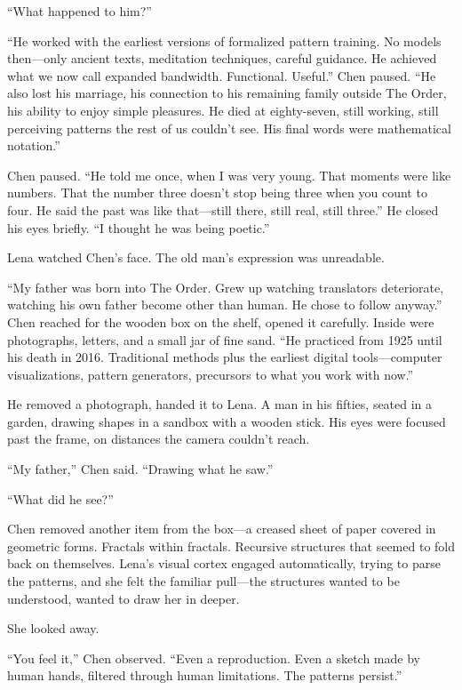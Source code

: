 ``What happened to him?''

``He worked with the earliest versions of formalized pattern training. No models then—only ancient texts, meditation techniques, careful guidance. He achieved what we now call expanded bandwidth. Functional. Useful.'' Chen paused. ``He also lost his marriage, his connection to his remaining family outside The Order, his ability to enjoy simple pleasures. He died at eighty-seven, still working, still perceiving patterns the rest of us couldn't see. His final words were mathematical notation.''

Chen paused. ``He told me once, when I was very young. That moments were like numbers. That the number three doesn't stop being three when you count to four. He said the past was like that---still there, still real, still three.'' He closed his eyes briefly. ``I thought he was being poetic.''

Lena watched Chen's face. The old man's expression was unreadable.

``My father was born into The Order. Grew up watching translators deteriorate, watching his own father become other than human. He chose to follow anyway.'' Chen reached for the wooden box on the shelf, opened it carefully. Inside were photographs, letters, and a small jar of fine sand. ``He practiced from 1925 until his death in 2016. Traditional methods plus the earliest digital tools—computer visualizations, pattern generators, precursors to what you work with now.''

He removed a photograph, handed it to Lena. A man in his fifties, seated in a garden, drawing shapes in a sandbox with a wooden stick. His eyes were focused past the frame, on distances the camera couldn't reach.

``My father,'' Chen said. ``Drawing what he saw.''

``What did he see?''

Chen removed another item from the box—a creased sheet of paper covered in geometric forms. Fractals within fractals. Recursive structures that seemed to fold back on themselves. Lena's visual cortex engaged automatically, trying to parse the patterns, and she felt the familiar pull—the structures wanted to be understood, wanted to draw her in deeper.

She looked away.

``You feel it,'' Chen observed. ``Even a reproduction. Even a sketch made by human hands, filtered through human limitations. The patterns persist.''

